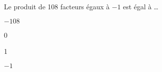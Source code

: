 \begin{QCM}
\begin{GroupeQCM}
    \begin{exercice}
      Le produit de 108 facteurs égaux à $-1$ est égal à \ldots
      \begin{ChoixQCM}{4}
      \item $-108$
      \item 0
      \item 1
      \item $-1$
      \end{ChoixQCM}
\begin{corrige}
   \end{corrige}
    \end{exercice}
    
\end{GroupeQCM}
\end{QCM}

  
